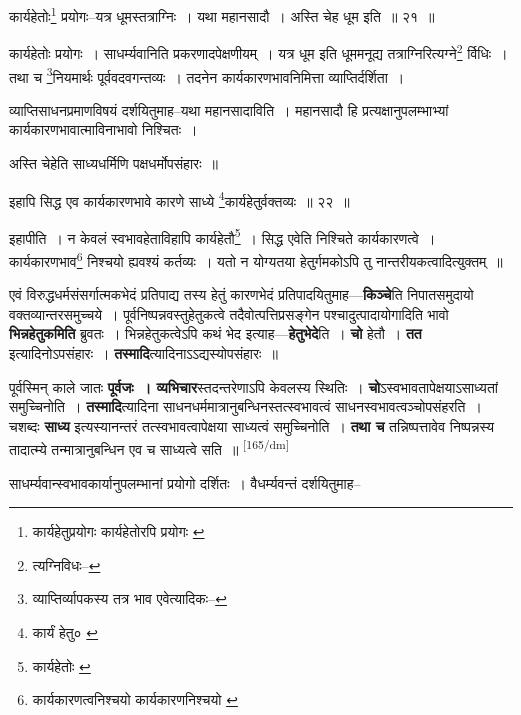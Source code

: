 \documentclass[article,12pt,a4paper]{memoir}
\begin{document}
	  \pstart कार्यहेतोः\footnote{कार्यहेतुप्रयोगः \cite{dp-msC} कार्यहेतोरपि प्रयोगः \cite{dp-msB} \cite{dp-msD} \cite{dp-edP} \cite{dp-edH} \cite{dp-edE} \cite{dp-edN}} प्रयोगः--यत्र धूमस्तत्राग्निः । यथा महानसादौ । अस्ति चेह धूम इति ॥ २१ ॥
	\pend
       

	  \pstart कार्यहेतोः प्रयोगः । साधर्म्यवानिति प्रकरणादपेक्षणीयम् । यत्र धूम इति धूममनूद्य तत्राग्निरित्यग्ने\footnote{त्यग्निविधः--\cite{dp-msB}} र्विधिः । तथा च \footnote{व्याप्तिर्व्यापकस्य तत्र भाव एवेत्यादिकः--\cite{dp-msD-n}}नियमार्थः पूर्ववदवगन्तव्यः । तदनेन कार्यकारणभावनिमित्ता व्याप्तिर्दर्शिता ।
	\pend
       

	  \pstart व्याप्तिसाधनप्रमाणविषयं दर्शयितुमाह--यथा महानसादाविति । महानसादौ हि प्रत्यक्षानुपलम्भाभ्यां कार्यकारणभावात्माविनाभावो निश्चितः ।
	\pend
       

	  \pstart अस्ति चेहेति साध्यधर्मिणि पक्षधर्मोपसंहारः ॥
	\pend
       

	  \pstart इहापि सिद्ध एव कार्यकारणभावे कारणे साध्ये \footnote{कार्यं हेतु० \cite{dp-msC} \cite{dp-msD}}कार्यहेतुर्वक्तव्यः ॥ २२ ॥
	\pend
       

	  \pstart इहापीति । न केवलं स्वभावहेताविहापि कार्यहेतौ\footnote{कार्यहेतोः \cite{dp-msB}} । सिद्ध एवेति निश्चिते कार्यकारणत्वे । कार्यकारणभाव\footnote{कार्यकारणत्वनिश्चयो \cite{dp-msA} \cite{dp-edP} \cite{dp-edH} \cite{dp-edN} कार्यकारणनिश्चयो \cite{dp-msC}} निश्चयो ह्यवश्यं कर्तव्यः । यतो न योग्यतया हेतुर्गमकोऽपि तु नान्तरीयकत्वादित्युक्तम् ॥
	\pend
      

	  \pstart एवं विरुद्धधर्मसंसर्गात्मकभेदं प्रतिपाद्य तस्य हेतुं कारणभेदं प्रतिपादयितुमाह—\textbf{किञ्चे}ति निपातसमुदायो वक्तव्यान्तरसमुच्चये । पूर्वनिष्पन्नवस्तुहेतुकत्वे तदैवोत्पत्तिप्रसङ्गेन पश्चादुत्पादायोगादिति भावो \textbf{भिन्नहेतुकमिति} ब्रुवतः । भिन्नहेतुकत्वेऽपि कथं भेद इत्याह—\textbf{हेतुभेदे}ति । \textbf{चो} हेतौ । \textbf{तत} इत्यादिनोऽपसंहारः । \textbf{तस्मादि}त्यादिनाऽऽद्यस्योपसंहारः ॥
	\pend
      

	  \pstart पूर्वस्मिन् काले जातः \textbf{पूर्वजः । व्यभिचार}स्तदन्तरेणाऽपि केवलस्य स्थितिः । \textbf{चो}ऽस्वभावतापेक्षयाऽसाध्यतां समुच्चिनोति । \textbf{तस्मादि}त्यादिना साधनधर्ममात्रानुबन्धिनस्तत्स्वभावत्वं साधनस्वभावत्वञ्चोपसंहरति । चशब्दः \textbf{साध्य} इत्यस्यानन्तरं तत्स्वभावत्वापेक्षया साध्यत्वं समुच्चिनोति । \textbf{तथा च} तन्निष्पत्तावेव निष्पन्नस्य तादात्म्ये तन्मात्रानुबन्धिन एव च साध्यत्वे सति ॥
	\pend
      \leavevmode\textsuperscript{\rmlatinfont\tiny [165/dm]}

	  \pstart साधर्म्यवान्स्वभावकार्यानुपलम्भानां प्रयोगो दर्शितः । वैधर्म्यवन्तं दर्शयितुमाह--
	\pend
       
\end{document}
